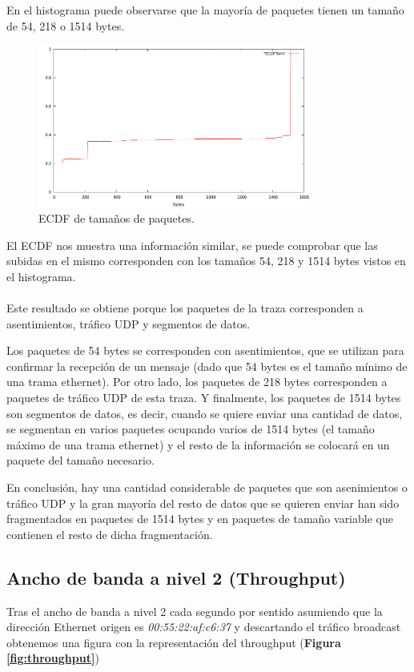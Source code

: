 \documentclass[a4paper, 11pt]{article}	%
\begin{document}
En el histograma puede observarse que la mayoría de paquetes tienen un tamaño de 54, 218 o 1514 bytes.

\begin{figure}[H]
\centering
\includegraphics[width=0.8\textwidth]{tam_ecdf.png}
\caption{ECDF de tamaños de paquetes.}
\label{fig:tam_ecdf}
\end{figure}

El ECDF nos muestra una información similar, se puede comprobar que las subidas en el mismo corresponden con los tamaños 54, 218 y 1514 bytes vistos en el histograma.
\\\\
Este resultado se obtiene porque los paquetes de la traza corresponden a asentimientos, tráfico UDP y segmentos de datos.

Los paquetes de 54 bytes se corresponden con asentimientos, que se utilizan para confirmar la recepción de un mensaje (dado que 54 bytes es el tamaño mínimo de una trama ethernet). Por otro lado, los paquetes de 218 bytes corresponden a paquetes de tráfico UDP de esta traza. Y finalmente, los paquetes de 1514 bytes son segmentos de datos, es decir, cuando se quiere enviar una cantidad de datos, se segmentan en varios paquetes ocupando varios de 1514 bytes (el tamaño máximo de una trama ethernet) y el resto de la información se colocará en un paquete del tamaño necesario.

En conclusión, hay una cantidad considerable de paquetes que son asenimientos o tráfico UDP y la gran mayoría del resto de datos que se quieren enviar han sido fragmentados en paquetes de 1514 bytes y en paquetes de tamaño variable que contienen el resto de dicha fragmentación.

\subsection{Ancho de banda a nivel 2 (Throughput)}
Tras el ancho de banda a nivel 2 cada segundo por sentido asumiendo que la dirección Ethernet origen es \textit{00:55:22:af:c6:37} y descartando el tráfico broadcast obtenemos una figura con la representación del throughput (\textbf{Figura \ref{fig:throughput}})
\end{document}
